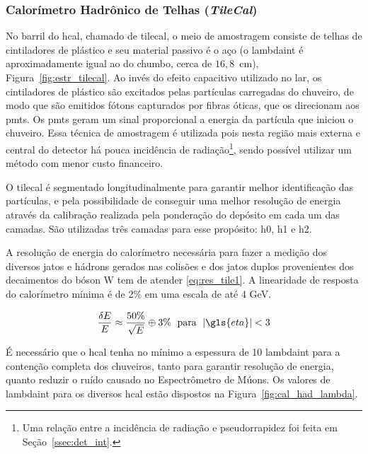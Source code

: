 \subsubsection{Calorímetro Hadrônico de Telhas (\emph{TileCal})}
\label{par:cal_tilecal}

No barril do \gls{hcal}, chamado de \gls{tilecal}, o meio de amostragem consiste de telhas de
cintiladores de plástico e seu material passivo é o aço (o \gls{lambdaint} é
aproximadamente igual ao do chumbo, cerca de $16,8$~cm), Figura~\ref{fig:estr_tilecal}. 
Ao invés do efeito capacitivo utilizado no \gls{lar}, os cintiladores de
plástico são excitados pelas partículas carregadas do chuveiro, de modo que são
emitidos fótons capturados por fibras óticas, que os direcionam aos
\glspl{pmt}. Os \glspl{pmt} geram um sinal proporcional a energia da partícula
que iniciou o chuveiro.
Essa técnica de amostragem é utilizada pois nesta região mais externa e central do detector 
há pouca incidência de radiação\footnote{Uma relação entre a incidência de
radiação e pseudorrapidez foi feita em Seção~\ref{ssec:det_int}.\label{fn:radiacao}}, 
sendo possível utilizar um método com menor custo financeiro.

O \gls{tilecal} é segmentado longitudinalmente para garantir melhor identificação
das partículas, e pela possibilidade de conseguir uma melhor resolução de
energia através da calibração realizada pela ponderação do depósito em cada um
das camadas. São utilizadas três camadas para esse propósito: \gls{h0}, \gls{h1} 
e \gls{h2}.

A resolução de energia do calorímetro necessária para fazer a medição dos
diversos jatos e hádrons gerados nas colisões e dos jatos duplos provenientes 
dos decaimentos do bóson W tem de atender \ref{eq:res_tile1}. 
A linearidade de resposta do calorímetro mínima é de 2\% em uma escala de até 4
GeV.

\begin{equation}\label{eq:res_tile1}
\frac{\delta E}{E} \approx \frac{50\%}{\sqrt{E}} \oplus 3\% \;\ \text{para} \;\
|\gls{eta}|<3
\end{equation}

É necessário que o \gls{hcal} tenha no mínimo a espessura de 10 \gls{lambdaint}
para a contenção completa dos chuveiros, tanto para garantir resolução de
energia, quanto reduzir o ruído causado no Espectrômetro de Múons. Os valores de
\gls{lambdaint} para os diversos \gls{hcal} estão dispostos na
Figura~\ref{fig:cal_had_lambda}.


